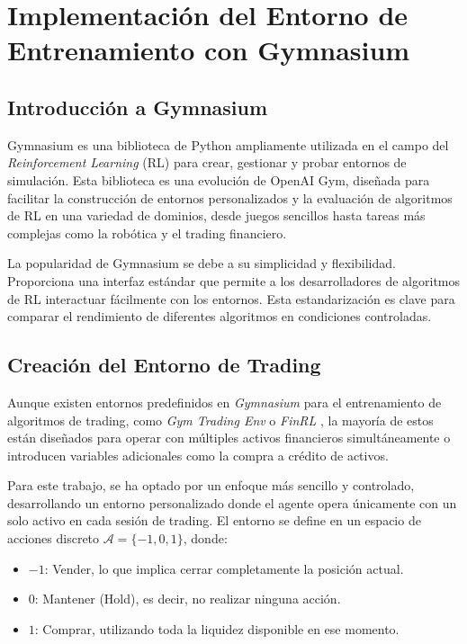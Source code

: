 \documentclass[a4paper,12pt, twoside]{report}
\begin{document}
\section{Implementación del Entorno de Entrenamiento con Gymnasium}

\subsection{Introducción a Gymnasium}

Gymnasium \cite{gymnasium2023} es una biblioteca de Python ampliamente utilizada en el campo del 
\textit{Reinforcement Learning} (RL) para crear, gestionar y probar entornos 
de simulación. Esta biblioteca es una evolución de OpenAI Gym, diseñada para 
facilitar la construcción de entornos personalizados y la evaluación de algoritmos 
de RL en una variedad de dominios, desde juegos sencillos hasta tareas más complejas 
como la robótica y el trading financiero.

La popularidad de Gymnasium se debe a su simplicidad y flexibilidad. Proporciona una 
interfaz estándar que permite a los desarrolladores de algoritmos de RL interactuar 
fácilmente con los entornos. Esta estandarización es clave para comparar el rendimiento 
de diferentes algoritmos en condiciones controladas.

\subsection{Creación del Entorno de Trading}

Aunque existen entornos predefinidos en \textit{Gymnasium} para el entrenamiento de 
algoritmos de trading, como \textit{Gym Trading Env} o \textit{FinRL} \cite{finrl_meta_2022}, la mayoría 
de estos están diseñados para operar con múltiples activos financieros simultáneamente 
o introducen variables adicionales como la compra a crédito de activos. 

Para este trabajo, se ha optado por un enfoque más sencillo y controlado, desarrollando 
un entorno personalizado donde el agente opera únicamente con un solo activo en cada 
sesión de trading. El entorno se define en un espacio de acciones discreto 
$\mathcal{A} = \{-1, 0, 1\}$, donde:

\begin{itemize}
    \item $-1$: Vender, lo que implica cerrar completamente la posición actual.
    \item $0$: Mantener (Hold), es decir, no realizar ninguna acción.
    \item $1$: Comprar, utilizando toda la liquidez disponible en ese momento.
\end{itemize}
\end{document}
